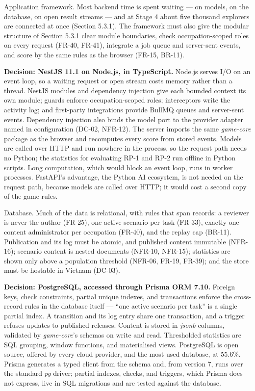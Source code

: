 Application framework. Most backend time is spent waiting --- on models, on the database, on open result streams --- and at Stage 4 about five thousand explorers are connected at once (Section 5.3.1). The framework must also give the modular structure of Section 5.3.1 clear module boundaries, check occupation-\allowbreak{}scoped roles on every request (FR-40, FR-41), integrate a job queue and server-sent events, and score by the same rules as the browser (FR-15, BR-11).

\textbf{Decision: NestJS 11.1 on Node.js, in TypeScript.\allowbreak{}} Node.js serves I/O on an event loop, so a waiting request or open stream costs memory rather than a thread. NestJS modules and dependency injection give each bounded context its own module; guards enforce occupation-\allowbreak{}scoped roles; interceptors write the activity log; and first-party integrations provide BullMQ queues and server-sent events\cite{r149}. Dependency injection also binds the model port to the provider adapter named in configuration (DC-02, NFR-12)\cite{r150}. The server imports the same \textit{game-core} package as the browser and recomputes every score from stored events. Models are called over HTTP and run nowhere in the process, so the request path needs no Python; the statistics for evaluating RP-1 and RP-2 run offline in Python scripts. Long computation, which would block an event loop, runs in worker processes. FastAPI's advantage, the Python AI ecosystem, is not needed on the request path, because models are called over HTTP; it would cost a second copy of the game rules.

Database. Much of the data is relational, with rules that span records: a reviewer is never the author (FR-25), one active scenario per task (FR-33), exactly one content administrator per occupation (FR-40), and the replay cap (BR-11). Publication and its log must be atomic, and published content immutable (NFR-16); scenario content is nested documents (NFR-10, NFR-15); statistics are shown only above a population threshold (NFR-06, FR-19, FR-39); and the store must be hostable in Vietnam (DC-03).

\textbf{Decision: PostgreSQL, accessed through Prisma ORM 7.10.} Foreign keys, check constraints, partial unique indexes, and transactions enforce the cross-\allowbreak{}record rules in the database itself --- ``one active scenario per task'' is a single partial index\cite{r151}. A transition and its log entry share one transaction, and a trigger refuses updates to published releases. Content is stored in \textit{jsonb} columns\cite{r152}, validated by \textit{game-\allowbreak{}core}'s schemas on write and read. Thresholded statistics are SQL grouping, window functions, and materialised views. PostgreSQL is open source, offered by every cloud provider, and the most used database, at 55.6\%\cite{r134}. Prisma generates a typed client from the schema and, from version 7, runs over the standard \textit{pg} driver\cite{r153}; partial indexes, checks, and triggers, which Prisma does not express, live in SQL migrations and are tested against the database.

